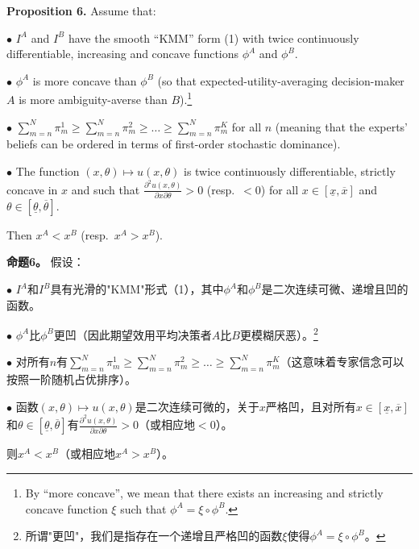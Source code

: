 \documentclass[12pt,a4paper]{article}
\newenvironment{original}
  {\par\noindent\ignorespaces}
  {\par}
\newenvironment{translation}
  {\par\noindent{\color{transblue}\ignorespaces}}
  {\par\medskip}
\begin{document}
\begin{original}
\textbf{Proposition 6.} Assume that:

$\bullet$ $I^{A}$ and $I^{B}$ have the smooth ``KMM'' form (1) with twice continuously differentiable, increasing and concave functions $\phi^{A}$ and $\phi^{B}$.

$\bullet$ $\phi^{A}$ is more concave than $\phi^{B}$ (so that expected-utility-averaging decision-maker $A$ is more ambiguity-averse than $B$).\footnote{By ``more concave'', we mean that there exists an increasing and strictly concave function $\xi$ such that $\phi^{A} = \xi \circ \phi^{B}$.}

$\bullet$ $\sum_{m=n}^{N} \pi^{1}_{m} \geq \sum_{m=n}^{N} \pi^{2}_{m} \geq \dots \geq \sum_{m=n}^{N} \pi^{K}_{m}$ for all $n$ (meaning that the experts' beliefs can be ordered in terms of first-order stochastic dominance).

$\bullet$ The function $(x, \theta) \mapsto u(x, \theta)$ is twice continuously differentiable, strictly concave in $x$ and such that $\frac{\partial^{2} u(x,\theta)}{\partial x \partial \theta} > 0$ (resp.\ $< 0$) for all $x \in [\underline{x}, \overline{x}]$ and $\theta \in [\underline{\theta}, \overline{\theta}]$.

Then $x^{A} < x^{B}$ (resp.\ $x^{A} > x^{B}$).
\end{original}

\begin{translation}
\textbf{命题6。} 假设：

$\bullet$ $I^{A}$和$I^{B}$具有光滑的"KMM"形式（1），其中$\phi^{A}$和$\phi^{B}$是二次连续可微、递增且凹的函数。

$\bullet$ $\phi^{A}$比$\phi^{B}$更凹（因此期望效用平均决策者$A$比$B$更模糊厌恶）。\footnote{所谓"更凹"，我们是指存在一个递增且严格凹的函数$\xi$使得$\phi^{A} = \xi \circ \phi^{B}$。}

$\bullet$ 对所有$n$有$\sum_{m=n}^{N} \pi^{1}_{m} \geq \sum_{m=n}^{N} \pi^{2}_{m} \geq \dots \geq \sum_{m=n}^{N} \pi^{K}_{m}$（这意味着专家信念可以按照一阶随机占优排序）。

$\bullet$ 函数$(x, \theta) \mapsto u(x, \theta)$是二次连续可微的，关于$x$严格凹，且对所有$x \in [\underline{x}, \overline{x}]$和$\theta \in [\underline{\theta}, \overline{\theta}]$有$\frac{\partial^{2} u(x,\theta)}{\partial x \partial \theta} > 0$（或相应地$< 0$）。

则$x^{A} < x^{B}$（或相应地$x^{A} > x^{B}$）。
\end{translation}
\end{document}
